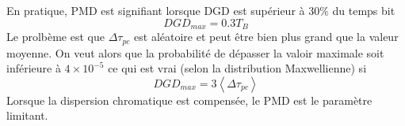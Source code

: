 	En pratique, PMD est signifiant lorsque DGD est supérieur à 30\% du temps bit
	\begin{equation}
	DGD_{max} = 0.3T_B
	\end{equation}
	Le prolbème est que $\Delta \tau_{pc}$ est aléatoire et peut être bien plus grand que la valeur 
	moyenne. On veut alors que la probabilité de dépasser la valoir maximale soit inférieure à
	$4\times 10^{-5}$ ce qui est vrai (selon la distribution Maxwellienne) si
	\begin{equation}
	DG{D_{max}} = 3\left\langle { {\Delta \tau _{pc}}} \right\rangle 
	\end{equation}
	Lorsque la dispersion chromatique est compensée, le PMD est le paramètre limitant.